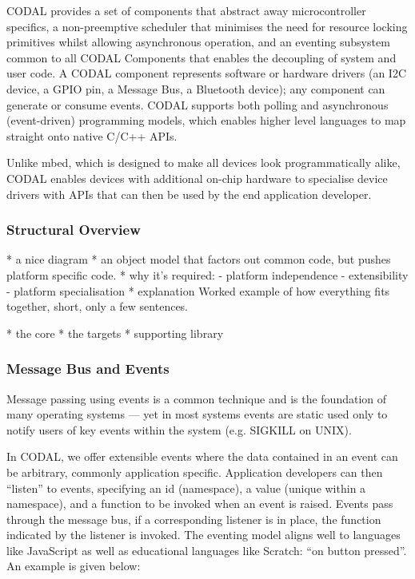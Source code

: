 CODAL provides a set of components that abstract away microcontroller specifics, a non-preemptive scheduler that minimises the need for resource locking primitives whilst allowing asynchronous operation, and an eventing subsystem common to all CODAL Components that enables the decoupling of system and user code. A CODAL component represents software or hardware drivers (an I2C device, a GPIO pin, a Message Bus, a Bluetooth device); any component can generate or consume events. CODAL supports both polling and asynchronous (event-driven) programming models, which enables higher level languages to map straight onto native C/C++ APIs.

Unlike mbed, which is designed to make all devices look programmatically alike, CODAL enables devices with additional on-chip hardware to specialise device drivers with APIs that can then be used by the end application developer.


\subsubsection{Structural Overview}

* a nice diagram
* an object model that factors out common code, but pushes platform specific code.
* why it's required:
    - platform independence
    - extensibility
    - platform specialisation
* explanation
Worked example of how everything fits together, short, only a few sentences.

* the core
* the targets
* supporting library

\subsubsection{Message Bus and Events}

Message passing using events is a common technique and is the foundation of many operating systems --- yet in most systems events are static used only to notify users of key events within the system (e.g. SIGKILL on UNIX).

In CODAL, we offer extensible events where the data contained in an event can be arbitrary, commonly application specific. Application developers can then ``listen'' to events, specifying an id (namespace), a value (unique within a namespace), and a function to be invoked when an event is raised. Events pass through the message bus, if a corresponding listener is in place, the function indicated by the listener is invoked. The eventing model aligns well to languages like JavaScript as well as educational languages like Scratch: ``on button pressed''. An example is given below:


